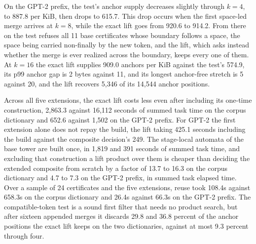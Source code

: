 \documentclass[11pt,a4paper]{article}
\theoremstyle{definition}
\theoremstyle{plain}
\begin{document}
 On the GPT-2 prefix, the test's anchor supply decreases slightly through $k = 4$, to 887.8
per KiB, then drops to 615.7. This drop occurs when the first space-led merge arrives at $k = 8$, while the exact lift
goes from 920.6 to 914.2. From there on the test refuses all 11 base certificates whose boundary follows a space, the
space being carried non-finally by the new token, and the lift, which asks instead whether the merge is ever realized
across the boundary, keeps every one of them. At $k = 16$ the exact lift supplies 909.0 anchors per KiB against the
test's 574.9, its p99 anchor gap is 2 bytes against 11, and its longest anchor-free stretch is 5 against 20, and the
lift recovers 5{,}346 of its 14{,}544 anchor positions.

Across all five extensions, the exact lift costs less even after including its one-time construction, 2{,}863.3 against
16{,}112 seconds of summed task time on the corpus dictionary and 652.6 against 1{,}502 on the GPT-2 prefix. For GPT-2
the first extension alone does not repay the build, the lift taking 425.1 seconds including the build against the
composite decision's 249. The stage-local automata of the base tower are built once, in 1{,}819 and 391 seconds of
summed task time, and excluding that construction a lift product over them is cheaper than deciding the extended
composite from scratch by a factor of 13.7 to 16.3 on the corpus dictionary and 4.7 to 7.3 on the GPT-2 prefix, in
summed task elapsed time. Over a sample of 24 certificates and the five extensions, reuse took 108.4s against 658.3s on
the corpus dictionary and 26.4s against 66.3s on the GPT-2 prefix. The compatible-token test is a sound first filter
that needs no product search, but after sixteen appended merges it discards 29.8 and 36.8 percent of the anchor
positions the exact lift keeps on the two dictionaries, against at most 9.3 percent through four.
\end{document}
